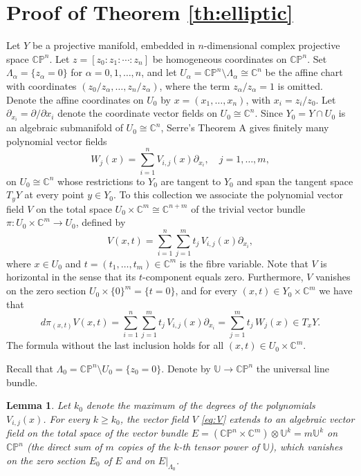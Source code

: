 \documentclass[12pt]{amsart}
\newtheorem{lemma}[theorem]{Lemma}
\theoremstyle{definition}
\numberwithin{equation}{section}
\numberwithin{figure}{section}
\newcommand\C{\mathbb{C}}
\newcommand\CP{\mathbb{CP}}
\newcommand\U{\mathbb{U}}
\newcommand\di{\partial}
\numberwithin{equation}{section}
\begin{document}
%
%
\section{Proof of Theorem \ref{th:elliptic}}\label{sec:proof}

Let $Y$ be a projective manifold, embedded in $n$-dimensional complex projective space $\CP^n$.
Let $z=[z_0:z_1:\cdots:z_n]$ be homogeneous coordinates
on $\CP^n$. Set $\Lambda_\alpha=\{z_\alpha=0\}$ for $\alpha=0,1,\ldots,n$, 
and let $U_\alpha=\CP^n\setminus \Lambda_\alpha\cong\C^n$ be the affine
chart with coordinates $(z_0/z_\alpha,\ldots,z_n/z_\alpha)$, 
where the term $z_\alpha/z_\alpha=1$ is omitted. 
Denote the affine coordinates on $U_0$ by $x=(x_1,\ldots,x_n)$,
with $x_i=z_i/z_0$. Let $\di_{x_i} = \di/\di x_i$ denote the coordinate
vector fields on $U_0\cong\C^n$.
Since $Y_0=Y\cap U_0$ is an algebraic submanifold
of $U_0\cong\C^n$, Serre's Theorem A
gives finitely many polynomial vector fields 
\begin{equation}\label{eq:Wj}
	W_j(x) = \sum_{i=1}^n V_{i,j}(x) \di_{x_i},\quad j=1,\ldots,m,
\end{equation} 
on $U_0\cong \C^n$ whose restrictions to $Y_0$ are tangent to $Y_0$ and  
span the tangent space $T_yY$ at every point $y\in Y_0$.
To this collection we associate the polynomial vector field $V$ on the 
total space $U_0\times \C^m\cong \C^{n+m}$
of the trivial vector bundle $\pi:U_0\times \C^m \to U_0$,
defined by
\begin{equation}\label{eq:V}
	V(x,t) = \sum_{i=1}^n \sum_{j=1}^m t_j \, V_{i,j}(x) \di_{x_i},
\end{equation}
where $x\in U_0$ and $t=(t_1,\ldots,t_m) \in \C^m$ is the fibre variable. 
Note that $V$ is horizontal in the sense that its $t$-component 
equals zero. Furthermore, $V$ vanishes on the zero section 
$U_0\times \{0\}^m=\{t=0\}$, 
and for every $(x,t) \in Y_0\times \C^m$ we have that  
\begin{equation}\label{eq:tangent}
	d\pi_{(x,t)} V(x,t) = 
	\sum_{i=1}^n \sum_{j=1}^m t_j\, V_{i,j}(x) \di_{x_i}
	= \sum_{j=1}^m t_j\, W_j(x) \in T_{x}Y.
\end{equation}
The formula without the last inclusion holds for all $(x,t)\in U_0\times \C^m$.

Recall that $\Lambda_0=\CP^n\setminus U_0=\{z_0=0\}$. 
Denote by $\U\to \CP^n$ the universal line bundle. 

\begin{lemma}\label{lem:V}
Let $k_0$ denote the maximum of the degrees of the polynomials $V_{i,j}(x)$.
For every $k\ge k_0$, the vector field $V$
\eqref{eq:V} extends to an algebraic vector field on the total space
of the vector bundle $E=(\CP^n \times \C^m)\otimes \U^k= m\U^k$ on 
$\CP^n$ (the direct sum of $m$ copies of the $k$-th tensor power of 
$\U$), which vanishes on the zero section
$E_0$ of $E$ and on $E|_{\Lambda_0}$. 
\end{lemma}
\end{document}
